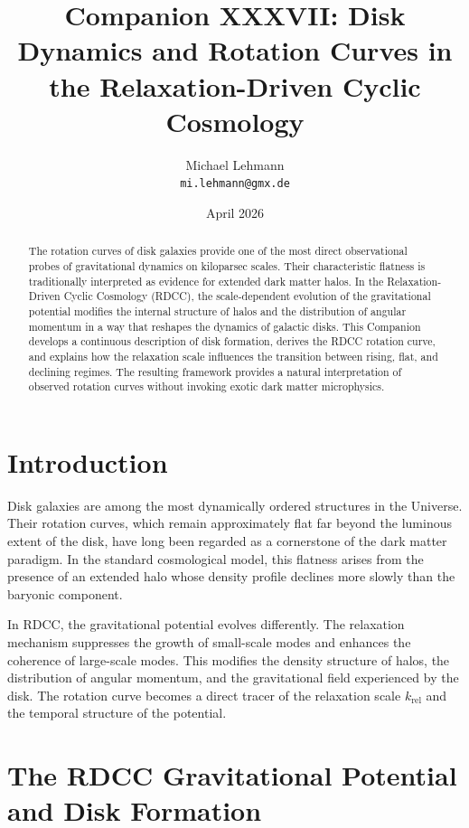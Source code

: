 \documentclass[11pt,a4paper]{article}
\title{\textbf{Companion XXXVII: Disk Dynamics and Rotation Curves in the Relaxation-Driven Cyclic Cosmology}}
\author{Michael Lehmann \\ \texttt{mi.lehmann@gmx.de}}
\date{April 2026}
\begin{document}
\maketitle

\begin{abstract}
The rotation curves of disk galaxies provide one of the most direct observational 
probes of gravitational dynamics on kiloparsec scales. Their characteristic flatness 
is traditionally interpreted as evidence for extended dark matter halos. In the 
Relaxation-Driven Cyclic Cosmology (RDCC), the scale-dependent evolution of the 
gravitational potential modifies the internal structure of halos and the distribution 
of angular momentum in a way that reshapes the dynamics of galactic disks. This 
Companion develops a continuous description of disk formation, derives the RDCC 
rotation curve, and explains how the relaxation scale influences the transition 
between rising, flat, and declining regimes. The resulting framework provides a 
natural interpretation of observed rotation curves without invoking exotic dark 
matter microphysics.
\end{abstract}
\section{Introduction}

Disk galaxies are among the most dynamically ordered structures in the Universe. 
Their rotation curves, which remain approximately flat far beyond the luminous 
extent of the disk, have long been regarded as a cornerstone of the dark matter 
paradigm. In the standard cosmological model, this flatness arises from the 
presence of an extended halo whose density profile declines more slowly than the 
baryonic component.

In RDCC, the gravitational potential evolves differently. The relaxation mechanism 
suppresses the growth of small-scale modes and enhances the coherence of large-scale 
modes. This modifies the density structure of halos, the distribution of angular 
momentum, and the gravitational field experienced by the disk. The rotation curve 
becomes a direct tracer of the relaxation scale $k_{\mathrm{rel}}$ and the temporal 
structure of the potential.
\section{The RDCC Gravitational Potential and Disk Formation}
\end{document}

